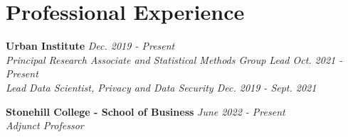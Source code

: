 \documentclass[11pt, letterpaper, roman]{moderncv} %
\newcommand{\workspace}{\vspace{3pt}}
\begin{document}
\section{Professional Experience}
    \textbf{Urban Institute} \hfill \textit{Dec. 2019 - Present}\\
    \textit{Principal Research Associate and Statistical Methods Group Lead \hfill Oct. 2021 - Present}\\
    \textit{Lead Data Scientist, Privacy and Data Security \hfill Dec. 2019 - Sept. 2021}

\workspace
    \textbf{Stonehill College - School of Business} \hfill \textit{June 2022 - Present}\\
    \textit{Adjunct Professor}
\end{document}
